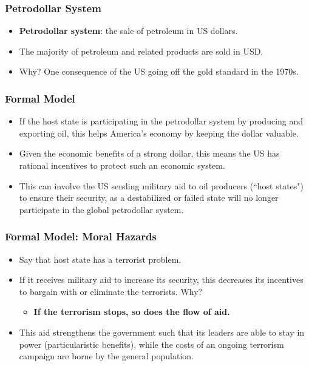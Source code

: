 \documentclass{beamer}
\begin{document}
\begin{frame} 
	\frametitle{\LARGE{Petrodollar System}}
	\begin{itemize}
		\item \textbf{Petrodollar system}: the sale of petroleum in US dollars. \pause
		\item The majority of petroleum and related products are sold in USD. \pause
		\item Why? One consequence of the US going off the gold standard in the 1970s. 
	\end{itemize}
\end{frame}

\begin{frame} 
	\frametitle{\LARGE{Formal Model}}
	\begin{itemize}
		\item If the host state is participating in the petrodollar system by producing and exporting oil, this helps America's economy by keeping the dollar valuable. \pause
		\item Given the economic benefits of a strong dollar, this means the US has rational incentives to protect such an economic system. \pause
		\item This can involve the US sending military aid to oil producers (``host states") to ensure their security, as a destabilized or failed state will no longer participate in the global petrodollar system.
	\end{itemize}
\end{frame}

\begin{frame} 
	\frametitle{\LARGE{Formal Model: Moral Hazards}}
	\begin{itemize}
		\item Say that host state has a terrorist problem. \pause
		\item If it receives military aid to increase its security, this decreases its incentives to bargain with or eliminate the terrorists. Why? \pause
		\begin{itemize}
			\item \textbf{If the terrorism stops, so does the flow of aid.}
		\end{itemize}
		\item This aid strengthens the government such that its leaders are able to stay in power (particularistic benefits), while the costs of an ongoing terrorism campaign are borne by the general population.
	\end{itemize}
\end{frame}
\end{document}

